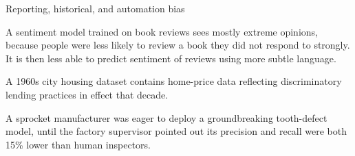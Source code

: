 \begin{frame}{Reporting, historical, and automation bias}
  \begin{withmargin}
    \begin{tdmargin}
      A sentiment model trained on book reviews sees mostly extreme opinions,
      because people were less likely to review a book they did not respond to
      strongly. It is then less able to predict sentiment of reviews using more
      subtle language.
      \par\medskip
      A 1960s city housing dataset contains home-price data reflecting
      discriminatory lending practices in effect that decade.
      \par\medskip
      A sprocket manufacturer was eager to deploy a groundbreaking tooth-defect
      model, until the factory supervisor pointed out its precision and recall
      were both 15\% lower than human inspectors.
    \end{tdmargin}
  \end{withmargin}
\end{frame}

